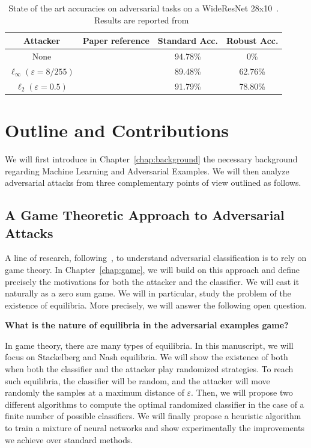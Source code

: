 \begin{table}[ht]
    \centering
    \begin{tabular}{c|c|c|c}
       \textbf{Attacker}  &  \textbf{Paper reference} & \textbf{Standard Acc.} & \textbf{Robust Acc.}  \\ \hline
        None & \citep{ZagoruykoK16} & 94.78\% & 0\%\\
        $\ell_\infty (\varepsilon=8/255)$&  \citep{rebuffi2021fixing}& 89.48\% & 62.76\%\\
        $\ell_2 (\varepsilon=0.5)$&  \citep{rebuffi2021fixing}& 91.79\% & 78.80\%\\
    \end{tabular}
    \caption{State of the art accuracies on adversarial tasks on a WideResNet 28x10~\citep{ZagoruykoK16}. Results are reported from~\citep{croce2020robustbench}}
\label{table:sota-cifar}
\end{table}

\section{Outline and Contributions}
We will first introduce in Chapter~\ref{chap:background} the necessary  background regarding Machine Learning and Adversarial Examples. We will then analyze  adversarial attacks from three complementary points of view outlined as follows.
\subsection{A Game Theoretic Approach to Adversarial Attacks}

A line of research, following~\cite{pinot2020randomization}, to understand adversarial classification is to rely on game theory. In Chapter~\ref{chap:game},  we will build on this approach and define precisely the motivations for both the attacker and the classifier. We will cast it naturally as a zero sum game. We will in particular, study the problem  of the existence of equilibria. More precisely, we will answer the following open question.
\medskip
\begin{tcolorbox}[colback=grund,colframe=rahmen,title=Question 1]
\textbf{What is the nature of equilibria in the adversarial examples game?}
\end{tcolorbox}
\medskip

In game theory, there are many types of equilibria. In this manuscript, we will focus on Stackelberg and Nash equilibria. We will show the existence of both when both the classifier and the attacker play randomized strategies. To reach such equilibria, the classifier will be random, and the attacker will move randomly the samples at a maximum distance of $\varepsilon$. Then, we will propose two different algorithms to compute the optimal randomized classifier in the case of a finite number of possible classifiers. We will finally propose a heuristic algorithm to train a mixture of neural networks and show experimentally the improvements we achieve over standard methods.

